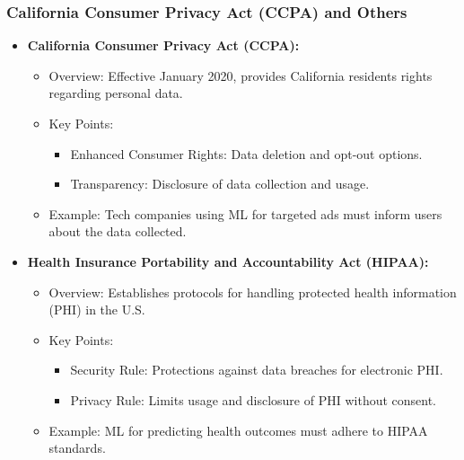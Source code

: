 \documentclass{beamer}
\begin{document}
\begin{frame}[fragile]
    \frametitle{California Consumer Privacy Act (CCPA) and Others}
    \begin{itemize}
        \item \textbf{California Consumer Privacy Act (CCPA):}
            \begin{itemize}
                \item Overview: Effective January 2020, provides California residents rights regarding personal data.
                \item Key Points:
                    \begin{itemize}
                        \item Enhanced Consumer Rights: Data deletion and opt-out options.
                        \item Transparency: Disclosure of data collection and usage.
                    \end{itemize}
                \item Example: Tech companies using ML for targeted ads must inform users about the data collected.
            \end{itemize}

        \item \textbf{Health Insurance Portability and Accountability Act (HIPAA):}
            \begin{itemize}
                \item Overview: Establishes protocols for handling protected health information (PHI) in the U.S.
                \item Key Points:
                    \begin{itemize}
                        \item Security Rule: Protections against data breaches for electronic PHI.
                        \item Privacy Rule: Limits usage and disclosure of PHI without consent.
                    \end{itemize}
                \item Example: ML for predicting health outcomes must adhere to HIPAA standards.
            \end{itemize}
    \end{itemize}
\end{frame}
\end{document}
